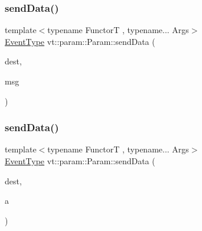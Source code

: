 \subsubsection{\texorpdfstring{send\+Data()}{sendData()}\hspace{0.1cm}{\footnotesize\ttfamily [6/7]}}
{\footnotesize\ttfamily template$<$typename FunctorT , typename... Args$>$ \\
\hyperlink{namespacevt_a009267401def7ae8bf201892222d060f}{Event\+Type} vt\+::param\+::\+Param\+::send\+Data (\begin{DoxyParamCaption}\item[{\hyperlink{namespacevt_a866da9d0efc19c0a1ce79e9e492f47e2}{Node\+Type} const \&}]{dest,  }\item[{\hyperlink{structvt_1_1param_1_1_data_msg}{Data\+Msg}$<$ std\+::tuple$<$ Args... $>$$>$ $\ast$}]{msg }\end{DoxyParamCaption})\hspace{0.3cm}{\ttfamily [inline]}}

\mbox{\label{structvt_1_1param_1_1_param_aba248d94d04ed2d6247af406685cdb36}} 
\subsubsection{\texorpdfstring{send\+Data()}{sendData()}\hspace{0.1cm}{\footnotesize\ttfamily [7/7]}}
{\footnotesize\ttfamily template$<$typename FunctorT , typename... Args$>$ \\
\hyperlink{namespacevt_a009267401def7ae8bf201892222d060f}{Event\+Type} vt\+::param\+::\+Param\+::send\+Data (\begin{DoxyParamCaption}\item[{\hyperlink{namespacevt_a866da9d0efc19c0a1ce79e9e492f47e2}{Node\+Type} const \&}]{dest,  }\item[{Args \&\&...}]{a }\end{DoxyParamCaption})\hspace{0.3cm}{\ttfamily [inline]}}

\mbox{\label{structvt_1_1param_1_1_param_ad665f1614785929383007acbc26a9a41}} 
